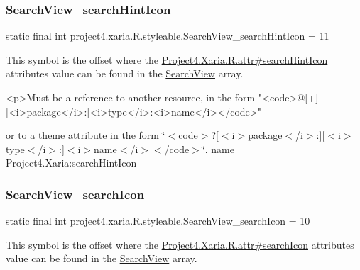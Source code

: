 \subsubsection{\texorpdfstring{Search\+View\+\_\+search\+Hint\+Icon}{SearchView\_searchHintIcon}}
{\footnotesize\ttfamily static final int project4.\+xaria.\+R.\+styleable.\+Search\+View\+\_\+search\+Hint\+Icon = 11\hspace{0.3cm}{\ttfamily [static]}}

This symbol is the offset where the \hyperlink{}{Project4.\+Xaria.\+R.\+attr\#search\+Hint\+Icon} attribute\textquotesingle{}s value can be found in the \hyperlink{classproject4_1_1xaria_1_1R_1_1styleable_a6308d960f6e1e05e5316efa4904fedfc}{Search\+View} array.

\begin{DoxyVerb}      <p>Must be a reference to another resource, in the form "<code>@[+][<i>package</i>:]<i>type</i>:<i>name</i></code>"
\end{DoxyVerb}
 or to a theme attribute in the form \char`\"{}$<$code$>$?\mbox{[}$<$i$>$package$<$/i$>$\+:\mbox{]}\mbox{[}$<$i$>$type$<$/i$>$\+:\mbox{]}$<$i$>$name$<$/i$>$$<$/code$>$\char`\"{}.  name Project4.\+Xaria\+:search\+Hint\+Icon \mbox{\label{classproject4_1_1xaria_1_1R_1_1styleable_a755d82e19c508ecb70f34634e682bb28}} 
\subsubsection{\texorpdfstring{Search\+View\+\_\+search\+Icon}{SearchView\_searchIcon}}
{\footnotesize\ttfamily static final int project4.\+xaria.\+R.\+styleable.\+Search\+View\+\_\+search\+Icon = 10\hspace{0.3cm}{\ttfamily [static]}}

This symbol is the offset where the \hyperlink{}{Project4.\+Xaria.\+R.\+attr\#search\+Icon} attribute\textquotesingle{}s value can be found in the \hyperlink{classproject4_1_1xaria_1_1R_1_1styleable_a6308d960f6e1e05e5316efa4904fedfc}{Search\+View} array.

